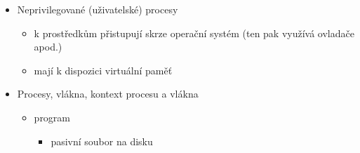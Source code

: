 \begin{itemize}
\begin{itemize}
\begin{itemize}
\end{itemize}
\item typy přerušení
\begin{itemize}
\item externí - hardwarové pomocí IRQ pinu, lze ho zamaskovat (deaktivovat - pomocí registru)
\item (hardwarová) výjimka - nastal problém s instrukcemi $\to$ procesor vyvolá přerušení a nechá na OS, aby situaci vyřešil
\begin{itemize}
\item výjimka typu trap se volá po instrukci, např. dělení nulou
\item u výjimek typu fault se procesor vrátí na stav před instrukcí, nechám OS, aby problém opravil, a potom instrukci pustím znova
\end{itemize}
\item softwarové - speciální instrukce
\end{itemize}
\item jak funguje přerušení
\begin{itemize}
\item CPU zjistí zdroj přerušení, získá adresu handleru (kdo přerušení zpracuje - je fixní nebo se použije tabulka)
\item proud instrukcí je přerušen, CPU začne vykonávat instrukce handleru (obvykle se přepne do privilegovaného režimu, protože handler je součástí kernelu)
\item handler uloží stav CPU
\item handler udělá něco užitečného
\item handler obnoví stav CPU
\item CPU pokračuje v původním proudu instrukcí
\end{itemize}
\end{itemize}
\item Neprivilegované (uživatelské) procesy
\begin{itemize}
\item k prostředkům přistupují skrze operační systém (ten pak využívá ovladače apod.)
\item mají k dispozici virtuální paměť
\end{itemize}
\item Procesy, vlákna, kontext procesu a vlákna
\begin{itemize}
\item program
\begin{itemize}
\item pasivní soubor na disku

\end{itemize}
\end{itemize}
\end{itemize}
